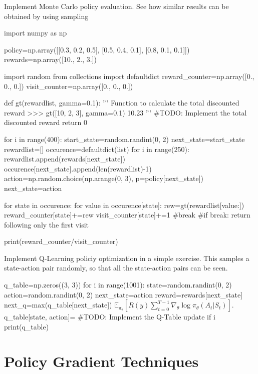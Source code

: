 \begin{exercise}
Implement Monte Carlo policy evaluation. See how similar results can be
obtained by using sampling
\begin{python}
import numpy as np

policy=np.array([[0.3, 0.2, 0.5], [0.5, 0.4, 0.1], [0.8, 0.1, 0.1]])
rewards=np.array([10., 2., 3.])

import random
from collections import defaultdict
reward_counter=np.array([0., 0., 0.])
visit_counter=np.array([0., 0., 0.])

def gt(rewardlist, gamma=0.1):
    '''
    Function to calculate the total discounted reward
    >>> gt([10, 2, 3], gamma=0.1)
    10.23
    '''
    #TODO: Implement the total discounted reward
    return 0

for i in range(400):
    start_state=random.randint(0, 2)
    next_state=start_state
    rewardlist=[]
    occurence=defaultdict(list) 
    for i in range(250):
        rewardlist.append(rewards[next_state]) 
        occurence[next_state].append(len(rewardlist)-1) 
        action=np.random.choice(np.arange(0, 3), p=policy[next_state]) 
        next_state=action

    for state in occurence: 
        for value in occurence[state]: 
            rew=gt(rewardlist[value:]) 
            reward_counter[state]+=rew 
            visit_counter[state]+=1 
            #break #if break: return following only the first visit

print(reward_counter/visit_counter)
\end{python}

Implement Q-Learning policiy optimization in a simple exercise. This samples a state-action pair randomly, so that all the state-action pairs can be seen.
\begin{python}
q_table=np.zeros((3, 3)) 
for i in range(1001): 
    state=random.randint(0, 2) 
    action=random.randint(0, 2) 
    next_state=action
    reward=rewards[next_state] 
    next_q=max(q_table[next_state])  $\mathbb{E}_{\pi_{\theta}}[R(y) \sum_{t=0}^{T-1}\nabla_{\theta} \log \pi_{\theta}(A_t|S_t)].$
    q_table[state, action]= #TODO: Implement the Q-Table update
    if i%
        print(q_table)
\end{python}
\end{exercise}


\section{Policy Gradient Techniques}

